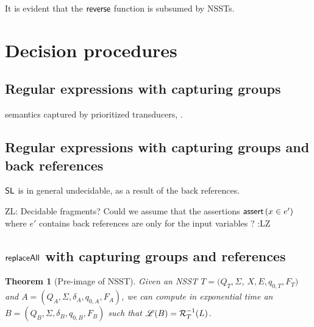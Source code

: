 \documentclass[sigplan,review,anonymous]{acmart}\settopmatter{printfolios=true,printccs=false,printacmref=false}
\newcommand{\zhilin}[1]{\color{brown} {ZL: #1 :LZ} \color{black}}
\newcommand{\zhilin}[1]{}
\newtheorem{theorem}{Theorem}
\newcommand\NSST{{\sf NSST}}
\begin{document}
It is evident that the $\mathsf{reverse}$ function is subsumed by \NSST{}s.


\section{Decision procedures}


\subsection{Regular expressions with capturing groups}

semantics captured by prioritized transducers, \cite{BM17}.

\subsection{Regular expressions with capturing groups and back references}

$\mathsf{SL}$ is in general undecidable, as a result of the back references.

\zhilin{Decidable fragments? Could we assume that the assertions $\textsf{assert}\left(x \in e'\right)$ where $e'$ contains back references are only for the input variables ?}

\subsection{$\mathsf{replaceAll}$ with capturing groups and references}

\begin{theorem}[Pre-image of \NSST{}]
  Given an \NSST{} $T = (Q_T, \Sigma$, $X, E, q_{0, T}, F_T)$ and \FA{} $A
  = (Q_A, \Sigma, \delta_A, q_{0, A}, F_A)$, we can compute in exponential time an \FA{} $B = (Q_B,
  \Sigma, \delta_B, q_{0, B}, F_B)$ such that $\mathscr{L}(B) = \mathcal{R}^{-1}_T(L)$. 
\end{theorem}
\end{document}
